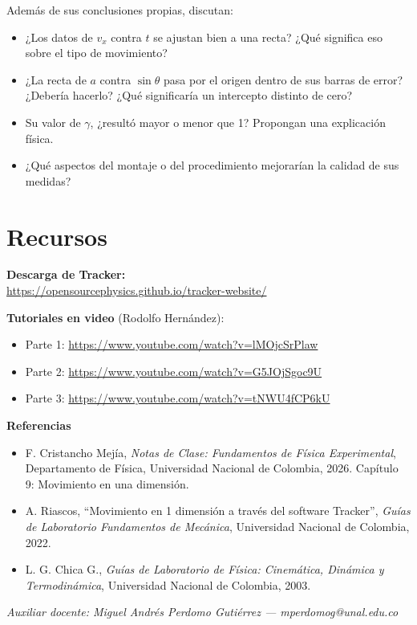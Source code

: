 \documentclass[11pt, letterpaper]{article}
\begin{document}
	Además de sus conclusiones propias, discutan:
	
	\begin{itemize}
		\item ¿Los datos de $v_x$ contra $t$ se ajustan bien a una recta? ¿Qué
		significa eso sobre el tipo de movimiento?
		\item ¿La recta de $a$ contra $\sin\theta$ pasa por el origen dentro de sus
		barras de error? ¿Debería hacerlo? ¿Qué significaría un intercepto distinto
		de cero?
		\item Su valor de $\gamma$, ¿resultó mayor o menor que 1? Propongan una
		explicación física.
		\item ¿Qué aspectos del montaje o del procedimiento mejorarían la calidad de
		sus medidas?
	\end{itemize}
	
	\section{Recursos}
	
	\noindent
	\textbf{Descarga de Tracker:} \\
	\url{https://opensourcephysics.github.io/tracker-website/}
	
	\vspace{0.25cm}
	\noindent
	\textbf{Tutoriales en video} (Rodolfo Hernández):
	\begin{itemize}
		\item Parte 1: \url{https://www.youtube.com/watch?v=lMOjcSrPlaw}
		\item Parte 2: \url{https://www.youtube.com/watch?v=G5JOjSgoc9U}
		\item Parte 3: \url{https://www.youtube.com/watch?v=tNWU4fCP6kU}
	\end{itemize}
	
	\vspace{0.25cm}
	\noindent
	\textbf{Referencias}
	\begin{itemize}
		\item F. Cristancho Mejía, \emph{Notas de Clase: Fundamentos de Física
			Experimental}, Departamento de Física, Universidad Nacional de Colombia,
		2026. Capítulo 9: Movimiento en una dimensión.
		\item A. Riascos, ``Movimiento en 1 dimensión a través del software
		Tracker'', \emph{Guías de Laboratorio Fundamentos de Mecánica},
		Universidad Nacional de Colombia, 2022.
		\item L. G. Chica G., \emph{Guías de Laboratorio de Física: Cinemática,
			Dinámica y Termodinámica}, Universidad Nacional de Colombia, 2003.
	\end{itemize}
	
	\vfill
	\noindent
	{\footnotesize \textit{Auxiliar docente: Miguel Andrés Perdomo Gutiérrez ---
			mperdomog@unal.edu.co}}
	
\end{document}
